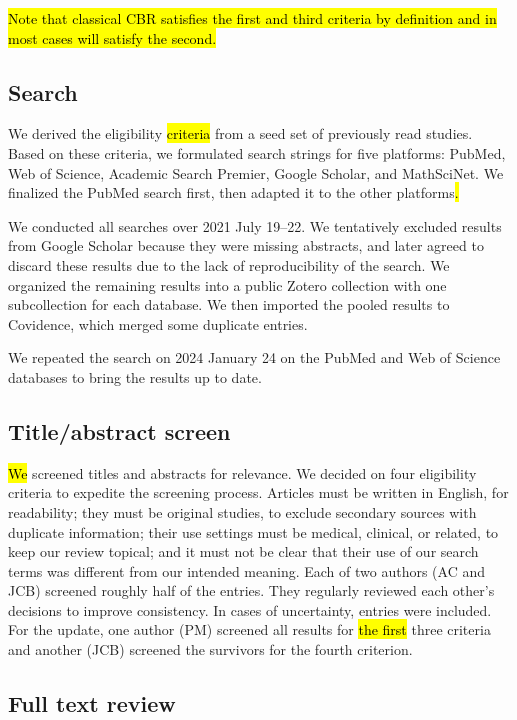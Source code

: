 \documentclass[sn-mathphys,Numbered,pdflatex]{sn-jnl}
\theoremstyle{remark}
\theoremstyle{definition}
\begin{document}
\hl{Note that classical CBR satisfies the first and third criteria by definition and in most cases will satisfy the second.}

\subsection{Search}\label{search}

We derived the eligibility \hl{criteria }from a seed set of previously
read studies. Based on these criteria, we formulated search strings for
five platforms: PubMed, Web of Science, Academic Search Premier, Google
Scholar, and MathSciNet. We finalized the PubMed search first, then
adapted it to the other platforms\hl{.}

We conducted all searches over 2021 July 19--22. We tentatively excluded
results from Google Scholar because they were missing abstracts, and
later agreed to discard these results due to the lack of reproducibility
of the search. We organized the remaining results into a public Zotero
collection with one subcollection for each database. We then imported
the pooled results to Covidence, which merged some duplicate entries.

We repeated the search on 2024 January 24 on the PubMed and Web of
Science databases to bring the results up to date.

\subsection{Title/abstract screen}\label{titleabstract-screen}

\hl{We} screened titles and abstracts for relevance. We decided on four
eligibility criteria to expedite the screening process. Articles must be
written in English, for readability; they must be original studies, to
exclude secondary sources with duplicate information; their use settings
must be medical, clinical, or related, to keep our review topical; and
it must not be clear that their use of our search terms was different
from our intended meaning. Each of two authors (AC and JCB) screened
roughly half of the entries. They regularly reviewed each other's
decisions to improve consistency. In cases of uncertainty, entries were
included. For the update, one author (PM) screened all results for
\hl{the first }three criteria and another (JCB) screened the survivors
for the fourth criterion.

\subsection{Full text review}\label{full-text-review}
\end{document}
